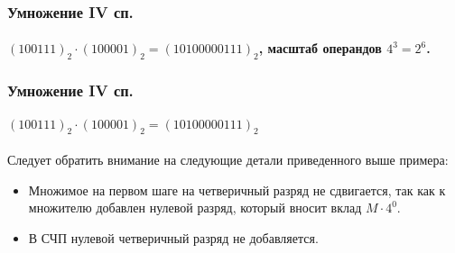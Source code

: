 \begin{frame}
    \frametitle{Умножение IV сп.}
    \framesubtitle{$(100111)_2\cdot(100001)_2=(10100000111)_2$, масштаб операндов $4^3=2^6$.}
    
\end{frame}

\begin{frame}
    \frametitle{Умножение IV сп.}
    \framesubtitle{$(100111)_2\cdot(100001)_2=(10100000111)_2$}
     
    Следует обратить внимание на следующие детали приведенного выше примера:
    \begin{itemize}
        \item Множимое на первом шаге на четверичный разряд не сдвигается, так как к множителю добавлен нулевой разряд, который вносит вклад $M\cdot 4^0$.
        \item В СЧП нулевой четверичный разряд не добавляется.
    \end{itemize}
\end{frame}


